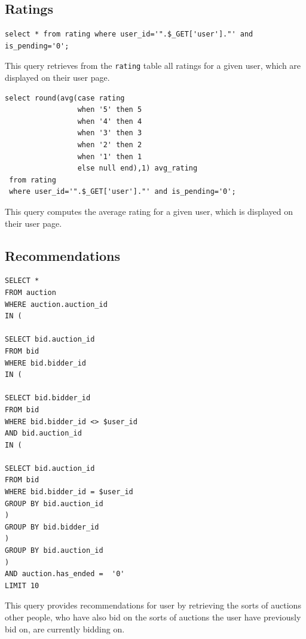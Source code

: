 \documentclass{article}
\begin{document}
\subsection{Ratings}
\begin{verbatim}
select * from rating where user_id='".$_GET['user']."' and is_pending='0';
\end{verbatim}
This query retrieves from the \texttt{rating} table all ratings for a given user, which are displayed on their user page.

\begin{verbatim}
select round(avg(case rating
                 when '5' then 5
                 when '4' then 4
                 when '3' then 3
                 when '2' then 2
                 when '1' then 1
                 else null end),1) avg_rating
 from rating
 where user_id='".$_GET['user']."' and is_pending='0';
\end{verbatim}
This query computes the average rating for a given user, which is displayed on their user page.

\subsection{Recommendations}
\begin{verbatim}
SELECT * 
FROM auction
WHERE auction.auction_id
IN (

SELECT bid.auction_id
FROM bid
WHERE bid.bidder_id
IN (

SELECT bid.bidder_id
FROM bid
WHERE bid.bidder_id <> $user_id 
AND bid.auction_id
IN (

SELECT bid.auction_id
FROM bid
WHERE bid.bidder_id = $user_id
GROUP BY bid.auction_id
)
GROUP BY bid.bidder_id
)
GROUP BY bid.auction_id
)
AND auction.has_ended =  '0'
LIMIT 10
\end{verbatim}
This query provides recommendations for user by retrieving the sorts of auctions other people, who have also bid on the sorts of auctions the user have previously bid on, are currently bidding on.
\end{document}
